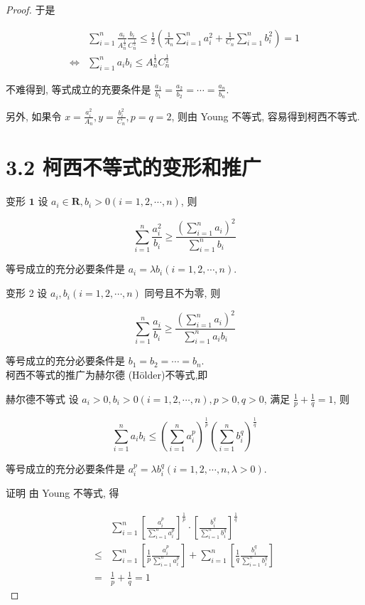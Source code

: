 \begin{proof}
	于是
	
	$$
	\begin{aligned}
	& \sum_{i=1}^{n} \frac{a_{i}}{A_{n}^{\frac{1}{2}}} \frac{b_{i}}{C_{n}^{\frac{1}{2}}} \leqslant \frac{1}{2}\left(\frac{1}{A_{n}} \sum_{i=1}^{n} a_{i}^{2}+\frac{1}{C_{n}} \sum_{i=1}^{n} b_{i}^{2}\right)=1 \\
	\Leftrightarrow & \sum_{i=1}^{n} a_{i} b_{i} \leqslant A_{n}^{\frac{1}{2}} C_{n}^{\frac{1}{2}}
	\end{aligned}
	$$
	
	不难得到, 等式成立的充要条件是 $\frac{a_{1}}{b_{1}}=\frac{a_{2}}{b_{2}}=\cdots=\frac{a_{n}}{b_{n}}$.
	
	另外, 如果令 $x=\frac{a_{i}^{2}}{A_{n}}, y=\frac{b_{i}^{2}}{C_{n}}, p=q=2$, 则由 Young 不等式, 容易得到柯西不等式.
	
	\section*{3.2 柯西不等式的变形和推广}
	变形 $\mathbf{1}$ 设 $a_{i} \in \mathbf{R}, b_{i}>0(i=1,2, \cdots, n)$, 则
	
	$$
	\sum_{i=1}^{n} \frac{a_{i}^{2}}{b_{i}} \geqslant \frac{\left(\sum_{i=1}^{n} a_{i}\right)^{2}}{\sum_{i=1}^{n} b_{i}}
	$$
	
	等号成立的充分必要条件是 $a_{i}=\lambda b_{i}(i=1,2, \cdots, n)$.
	
	变形 2 设 $a_{i}, b_{i}(i=1,2, \cdots, n)$ 同号且不为零, 则
	
	$$
	\sum_{i=1}^{n} \frac{a_{i}}{b_{i}} \geqslant \frac{\left(\sum_{i=1}^{n} a_{i}\right)^{2}}{\sum_{i=1}^{n} a_{i} b_{i}}
	$$
	
	等号成立的充分必要条件是 $b_{1}=b_{2}=\cdots=b_{n}$.\\
	柯西不等式的推广为赫尔德 (Hölder)不等式,即
	
	赫尔德不等式 设 $a_{i}>0, b_{i}>0(i=1,2, \cdots, n), p>0, q>0$, 满足 $\frac{1}{p}+\frac{1}{q}=1$, 则
	
	$$
	\sum_{i=1}^{n} a_{i} b_{i} \leqslant\left(\sum_{i=1}^{n} a_{i}^{p}\right)^{\frac{1}{p}}\left(\sum_{i=1}^{n} b_{i}^{q}\right)^{\frac{1}{q}}
	$$
	
	等号成立的充分必要条件是 $a_{i}^{p}=\lambda b_{i}^{q}(i=1,2, \cdots, n, \lambda>0)$.
	
	证明 由 Young 不等式, 得
	
	$$
	\begin{aligned}
	& \sum_{i=1}^{n}\left[\frac{a_{i}^{p}}{\sum_{i=1}^{n} a_{i}^{p}}\right]^{\frac{1}{p}} \cdot\left[\frac{b_{i}^{q}}{\sum_{i=1}^{n} b_{i}^{q}}\right]^{\frac{1}{q}} \\
	\leqslant & \sum_{i=1}^{n}\left[\frac{1}{p} \frac{a_{i}^{p}}{\sum_{i=1}^{n} a_{i}^{p}}\right]+\sum_{i=1}^{n}\left[\frac{1}{q} \frac{b_{i}^{q}}{\sum_{i=1}^{n} b_{i}^{q}}\right] \\
	= & \frac{1}{p}+\frac{1}{q}=1
	\end{aligned}
	$$
	

\end{proof}

